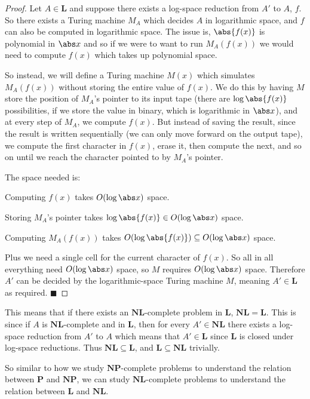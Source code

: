 \documentclass[10pt]{article}
\def\P{\mathbf{P}}
\def\NP{\mathbf{NP}}
\def\L{\mathbf{L}}
\def\NL{\mathbf{NL}}
\def\qed{%
    \ifmmode%
        \eqno\blacksquare%
    \else%
        \hskip1cm\allowbreak\hbox{}\nobreak\hfill$\blacksquare$%
    \fi%
}
\begin{document}
\begin{proof}

    Let $A\in\L$ and suppose there exists a log-space reduction from $A'$ to $A$, $f$.
    So there exists a Turing machine $M_A$ which decides $A$ in logarithmic space, and $f$ can also be computed in logarithmic space.
    The issue is, $\abs{f(x)}$ is polynomial in $\abs x$ and so if we were to want to run $M_A(f(x))$ we would need to compute $f(x)$ which takes up polynomial space.

    So instead, we will define a Turing machine $M(x)$ which simulates $M_A(f(x))$ without storing the entire value of $f(x)$.
    We do this by having $M$ store the position of $M_A$'s pointer to its input tape (there are $\log\abs{f(x)}$ possibilities, if we store the value in binary, which is logarithmic in $\abs x$), and at
    every step of $M_A$, we compute $f(x)$.
    But instead of saving the result, since the result is written sequentially (we can only move forward on the output tape), we compute the first character in $f(x)$, erase it, then compute the next, and
    so on until we reach the character pointed to by $M_A$'s pointer.

    The space needed is:
    \benum
        \item Computing $f(x)$ takes $O(\log\abs x)$ space.
        \item Storing $M_A$'s pointer takes $\log\abs{f(x)}\in O(\log\abs x)$ space.
        \item Computing $M_A(f(x))$ takes $O(\log\abs{f(x)})\subseteq O(\log\abs x)$ space.
        \item Plus we need a single cell for the current character of $f(x)$.
    \eenum
    So all in all everything need $O(\log\abs x)$ space, so $M$ requires $O(\log\abs x)$ space.
    Therefore $A'$ can be decided by the logarithmic-space Turing machine $M$, meaning $A'\in\L$ as required.
    \qed

\end{proof}

This means that if there exists an $\NL$-complete problem in $\L$, $\NL=\L$.
This is since if $A$ is $\NL$-complete and in $\L$, then for every $A'\in\NL$ there exists a log-space reduction from $A'$ to $A$ which means that $A'\in\L$ since $\L$ is closed under log-space reductions.
Thus $\NL\subseteq\L$, and $\L\subseteq\NL$ trivially.

So similar to how we study $\NP$-complete problems to understand the relation between $\P$ and $\NP$, we can study $\NL$-complete problems to understand the relation between $\L$ and $\NL$.
\end{document}

